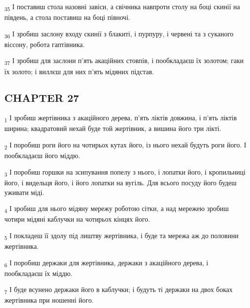 \begin{tcolorbox}
\textsubscript{35} І поставиш стола назовні завіси, а свічника навпроти столу на боці скинії на південь, а стола поставиш на боці півночі.
\end{tcolorbox}
\begin{tcolorbox}
\textsubscript{36} І зробиш заслону входу скинії з блакиті, і пурпуру, і червені та з суканого віссону, робота гаптівника.
\end{tcolorbox}
\begin{tcolorbox}
\textsubscript{37} І зробиш для заслони п'ять акаційних стовпів, і пообкладаєш їх золотом; гаки їх золото; і виллєш для них п'ять мідяних підстав.
\end{tcolorbox}
\subsection{CHAPTER 27}
\begin{tcolorbox}
\textsubscript{1} І зробиш жертівника з акаційного дерева, п'ять ліктів довжина, і п'ять ліктів ширина; квадратовий нехай буде той жертівник, а вишина його три лікті.
\end{tcolorbox}
\begin{tcolorbox}
\textsubscript{2} І поробиш роги його на чотирьох кутах його, із нього нехай будуть роги його. І пообкладаєш його міддю.
\end{tcolorbox}
\begin{tcolorbox}
\textsubscript{3} І поробиш горшки на зсипування попелу з нього, і лопатки його, і кропильниці його, і видельця його, і його лопатки на вугіль. Для всього посуду його будеш уживати міді.
\end{tcolorbox}
\begin{tcolorbox}
\textsubscript{4} І зробиш для нього мідяну мережу роботою сітки, а над мережею зробиш чотири мідяні каблучки на чотирьох кінцях його.
\end{tcolorbox}
\begin{tcolorbox}
\textsubscript{5} І покладеш її здолу під лиштву жертівника, і буде та мережа аж до половини жертівника.
\end{tcolorbox}
\begin{tcolorbox}
\textsubscript{6} І поробиш держаки для жертівника, держаки з акаційного дерева, і пообкладаєш їх міддю.
\end{tcolorbox}
\begin{tcolorbox}
\textsubscript{7} І буде всунено держаки його в каблучки; і будуть ті держаки на двох боках жертівника при ношенні його.
\end{tcolorbox}
